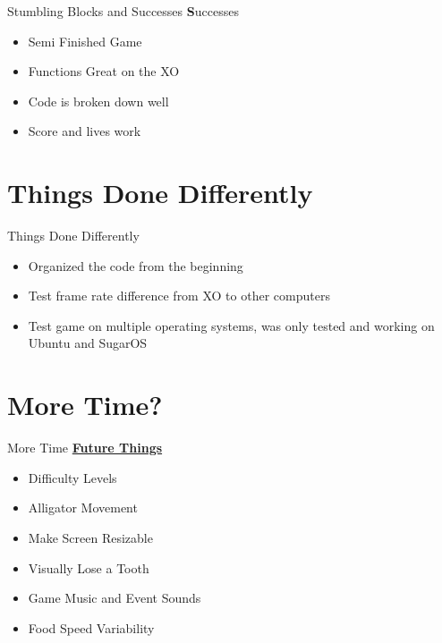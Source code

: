 \documentclass[10pt, compress]{beamer}
\begin{document}
\begin{frame}{Stumbling Blocks and Successes}
    \textbf Successes
    \begin{itemize}
    \item Semi Finished Game
    \item Functions Great on the XO
    \item Code is broken down well
    \item Score and lives work
    \end{itemize}
\end{frame}

\section{Things Done Differently}

\begin{frame}{Things Done Differently}
    \begin{itemize}
    \item Organized the code from the beginning
    \item Test frame rate difference from XO to other computers
    \item Test game on multiple operating systems, was only tested and working on Ubuntu and SugarOS
    \end{itemize}
\end{frame}

\section{More Time?}

\begin{frame}{More Time}
    \textbf{\href{https://github.com/amm4108/AngleGators/issues?q=is\%3Aopen+is\%3Aissue+milestone\%3A\%22Future+Things\%22}{Future Things}}
    \begin{itemize}
    \item Difficulty Levels
    \item Alligator Movement
    \item Make Screen Resizable
    \item Visually Lose a Tooth
    \item Game Music and Event Sounds
    \item Food Speed Variability
    \end{itemize}
    
\end{frame}
\end{document}
